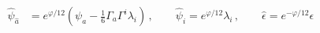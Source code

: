 \begin{equation}
  \begin{array}{rcl}
{\hat \psi}_{\hat a} & = e^{\varphi/12}\left( \psi_{a} - \frac{1}{6} 
\Gamma_{a} \Gamma^{i} \lambda_i \right ) \,, \qquad {\hat\psi}_{i} = 
e^{\varphi/12} \lambda_i \,, \qquad \hat \epsilon = e^{-\varphi/12} \epsilon 
\,
  \end{array}
\end{equation}

